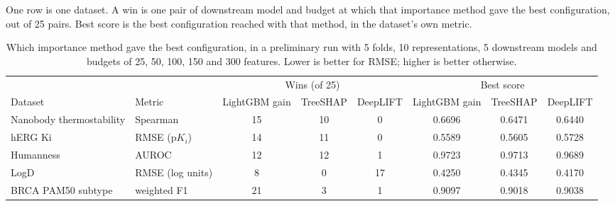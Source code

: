 One row is one dataset. A win is one pair of downstream model and budget at which that importance method gave the best configuration, out of 25 pairs. Best score is the best configuration reached with that method, in the dataset's own metric.
\begin{table}[htbp]
\centering
\caption{Which importance method gave the best configuration, in a preliminary run with 5 folds, 10 representations, 5 downstream models and budgets of 25, 50, 100, 150 and 300 features. Lower is better for RMSE; higher is better otherwise.}
\label{tab:importance_wins}
\small
\begin{tabular}{@{}llcccccc@{}}
\toprule
 & & \multicolumn{3}{c}{Wins (of 25)} & \multicolumn{3}{c}{Best score} \\
\cmidrule(lr){3-5}\cmidrule(lr){6-8}
Dataset & Metric & LightGBM gain & TreeSHAP & DeepLIFT & LightGBM gain & TreeSHAP & DeepLIFT \\
\midrule
Nanobody thermostability & Spearman & 15 & 10 & 0 & 0.6696 & 0.6471 & 0.6440 \\
hERG Ki & RMSE (p$K_i$) & 14 & 11 & 0 & 0.5589 & 0.5605 & 0.5728 \\
Humanness & AUROC & 12 & 12 & 1 & 0.9723 & 0.9713 & 0.9689 \\
LogD & RMSE (log units) & 8 & 0 & 17 & 0.4250 & 0.4345 & 0.4170 \\
BRCA PAM50 subtype & weighted F1 & 21 & 3 & 1 & 0.9097 & 0.9018 & 0.9038 \\
\bottomrule
\end{tabular}
\end{table}


